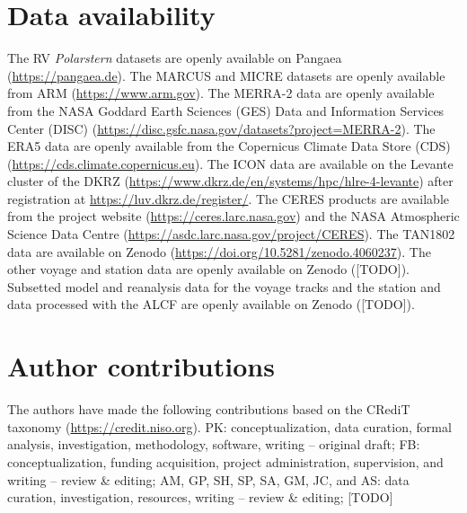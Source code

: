 \documentclass[12pt,a4paper]{article}
\begin{document}
\section*{Data availability}

The RV \emph{Polarstern} datasets are openly available on Pangaea
(\url{https://pangaea.de}). The MARCUS and MICRE datasets are openly available
from ARM (\url{https://www.arm.gov}). The MERRA-2 data are openly available
from the NASA Goddard Earth Sciences (GES) Data and Information Services Center
(DISC) (\url{https://disc.gsfc.nasa.gov/datasets?project=MERRA-2}).  The ERA5
data are openly available from the Copernicus Climate Data Store (CDS)
(\url{https://cds.climate.copernicus.eu}). The ICON data are available on the
Levante cluster of the DKRZ
(\url{https://www.dkrz.de/en/systems/hpc/hlre-4-levante}) after registration at
\url{https://luv.dkrz.de/register/}. The CERES products are available from the
project website (\url{https://ceres.larc.nasa.gov}) and the NASA Atmospheric
Science Data Centre (\url{https://asdc.larc.nasa.gov/project/CERES}).  The
TAN1802 data are available on Zenodo
(\url{https://doi.org/10.5281/zenodo.4060237}).  The other voyage and station
data are openly available on Zenodo ([TODO]). Subsetted model and reanalysis data
for the voyage tracks and the station and data processed with the ALCF are
openly available on Zenodo ([TODO]).

\section*{Author contributions}

The authors have made the following contributions based on the CRediT taxonomy
(\url{https://credit.niso.org}).  PK: conceptualization, data curation, formal
analysis, investigation, methodology, software, writing – original draft; FB:
conceptualization, funding acquisition, project administration, supervision,
and writing – review \& editing; AM, GP, SH, SP, SA, GM, JC, and AS: data
curation, investigation, resources, writing – review \& editing; [TODO]

\fontsize{11pt}{13pt}\selectfont
\setlength{\bibsep}{0.0pt}

\end{document}
